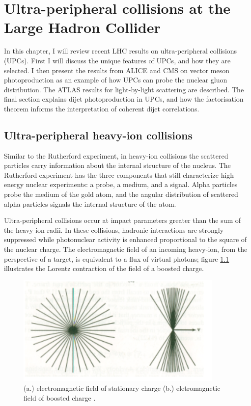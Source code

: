 \setlength\abovedisplayskip{0.4pt}
\setlength\belowdisplayskip{0.4pt}

\chapter{Ultra-peripheral collisions at the Large Hadron Collider}

In this chapter, I will review recent LHC results on ultra-peripheral collisions (UPCs). First I will discuss the unique features of UPCs, and how they are selected. I then present the results from ALICE and CMS on vector meson photoproduction as an example of how UPCs can probe the nuclear gluon distribution. The ATLAS results for light-by-light scattering are described. The final section explains dijet photoproduction in UPCs, and how the factorisation theorem informs the interpretation of coherent dijet correlations. 

\section{Ultra-peripheral heavy-ion collisions}

Similar to the Rutherford experiment, in heavy-ion collisions the scattered particles carry information about the internal structure of the nucleus. The Rutherford experiment has the three components that still characterize high-energy nuclear experiments: a probe, a medium, and a signal. Alpha particles probe the medium of the gold atom, and the angular distribution of scattered alpha particles signals the internal structure of the atom. 

Ultra-peripheral collisions occur at impact parameters greater than the sum of the heavy-ion radii. In these collisions, hadronic interactions are strongly suppressed while photonuclear activity is enhanced proportional to the square of the nuclear charge. The electromagnetic field of an incoming heavy-ion, from the perspective of a target, is equivalent to a flux of virtual photons; figure \ref{fig:smushedField} illustrates the Lorentz contraction of the field of a boosted charge.
\begin{figure}[h!]
\begin{centering}
\includegraphics[width=4in]{Chapter1/importfigs/jackson_em_wwa.png}
\par\end{centering}
\caption{ (a.) electromagnetic field of stationary charge (b.) eletromagnetic field of boosted charge \cite{WWJackson}. \label{fig:smushedField}}
\end{figure}


